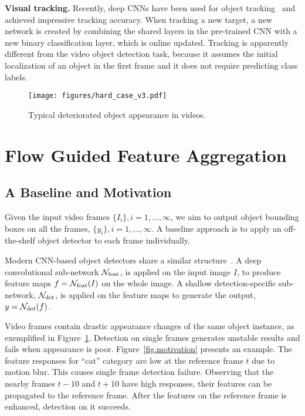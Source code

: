 \documentclass[10pt,twocolumn,letterpaper]{article}
\begin{document}
\textbf{Visual tracking.}  Recently, deep CNNs have been used for object tracking~\cite{Wang2015tracking,Nam2015tracking} and achieved impressive tracking accuracy. When tracking a new target, a new network is created by combining the shared layers in the pre-trained CNN with a new binary classification layer, which is online updated. Tracking is apparently different from the video object detection task, because it assumes the initial localization of an object in the first frame and it does not require predicting class labels.

\begin{figure}
\begin{center}
\texttt{[image: figures/hard\_case\_v3.pdf]}
\end{center}
\caption{Typical deteriorated object appearance in videos.}
\label{fig.challenges}
\end{figure}

\section{Flow Guided Feature Aggregation}

\subsection{A Baseline and Motivation}

Given the input video frames $\{I_i\}, i=1, \ldots, \infty$, we aim to output object bounding boxes on all the frames, $\{y_i\}, i=1, \ldots, \infty$. A baseline approach is to apply an off-the-shelf object detector to each frame individually.

Modern CNN-based object detectors share a similar structure~\cite{girshick2014rich,girshick2015fast,ren2015faster,liu2016ssd,dai2016rfcn}. A deep convolutional sub-network $\mathcal{N}_{\rm feat}$, is applied on the input image $I$, to produce feature maps $f=\mathcal{N}_{\rm feat}(I)$ on the whole image. A shallow detection-specific sub-network, $\mathcal{N}_{\rm det}$, is applied on the feature maps to generate the output, $y = \mathcal{N}_{\rm det} (f)$.

Video frames contain drastic appearance changes of the same object instance, as exemplified in Figure~\ref{fig.challenges}. Detection on single frames generates unstable results and fails when appearance is poor. Figure~\ref{fig.motivation} presents an example. The feature responses for ``cat'' category are low at the reference frame $t$ due to motion blur. This causes single frame detection failure. Observing that the nearby frames $t-10$ and $t+10$ have high responses, their features can be propagated to the reference frame. After the features on the reference frame is enhanced, detection on it succeeds.
\end{document}
